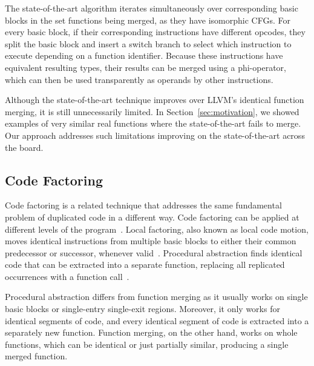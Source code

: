 The state-of-the-art algorithm iterates simultaneously over corresponding basic
blocks in the set functions being merged, as they have isomorphic CFGs.
For every basic block, if their corresponding instructions have different opcodes,
they split the basic block and insert a switch branch to select which instruction
to execute depending on a function identifier.
Because these instructions have equivalent resulting types, their results can be
merged using a phi-operator, which can then be used transparently as operands
by other instructions.

Although the state-of-the-art technique improves over LLVM's identical function merging, it is
still unnecessarily limited. In Section~\ref{sec:motivation}, we showed examples of very similar
real functions where the state-of-the-art fails to merge. Our approach addresses such limitations
improving on the state-of-the-art across the board.

\subsection{Code Factoring}

Code factoring is a related technique that addresses the same fundamental
problem of duplicated code in a different way.
Code factoring can be applied at different levels of the program~\cite{loki04}.
Local factoring, also known as local code motion, moves identical instructions
from multiple basic blocks to either their common predecessor or successor,
whenever valid~\cite{knoop94,briggs94,loki04}.
Procedural abstraction %
finds identical code
that can be extracted into a separate function, replacing all replicated
occurrences with a function call~\cite{loki04,dreweke07}.

Procedural abstraction differs from function merging as it usually works on
single basic blocks or single-entry single-exit regions.
Moreover, it only works for identical segments of code, and every identical
segment of code is extracted into a separately new function.
Function merging, on the other hand, works on whole functions, which can be
identical or just partially similar, producing a single merged function.

